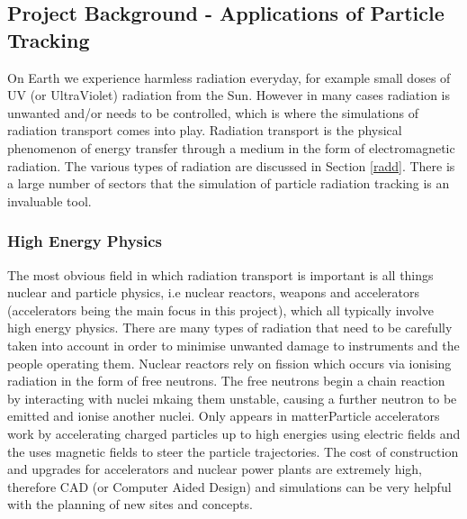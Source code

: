 \documentclass[12pt,a4paper]{article}
\begin{document}
\subsection{Project Background - Applications of Particle Tracking}
\label{back}
On Earth we experience harmless radiation everyday, for example small doses of UV (or UltraViolet) radiation from the Sun. However in many cases radiation is unwanted and/or needs to be controlled, which is where the simulations of radiation transport comes into play. Radiation transport is the physical phenomenon of energy transfer through a medium in the form of electromagnetic radiation. The various types of radiation are discussed in Section \ref{radd}. There is a large number of sectors that the simulation of particle radiation tracking is an invaluable tool.

\subsubsection{High Energy Physics}
\noindent The most obvious field in which radiation transport is important is all things nuclear and particle physics, i.e nuclear reactors, weapons and accelerators (accelerators being the main focus in this project), which all typically involve high energy physics. There are many types of radiation that need to be carefully taken into account in order to minimise unwanted damage to instruments and the people operating them. Nuclear reactors rely on fission which occurs via ionising radiation in the form of free neutrons. The free neutrons begin a chain reaction by interacting with nuclei mkaing them unstable, causing a further neutron to be emitted and ionise another nuclei. Only appears in matterParticle accelerators work by accelerating charged particles up to high energies using electric fields and the uses magnetic fields to steer the particle trajectories. The cost of construction and upgrades for accelerators and nuclear power plants are extremely high, therefore CAD (or Computer Aided Design) and simulations can be very helpful with the planning of new sites and concepts. 
\end{document}
